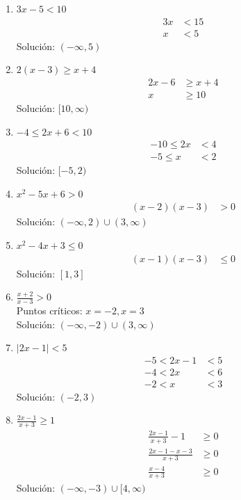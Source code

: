 \documentclass[12pt,a4paper]{article}
\begin{document}
\begin{enumerate}
    \item $3x - 5 < 10$
    \begin{align*}
        3x &< 15\\
        x &< 5
    \end{align*}
    Solución: $(-\infty, 5)$
    
    \item $2(x - 3) \geq x + 4$
    \begin{align*}
        2x - 6 &\geq x + 4\\
        x &\geq 10
    \end{align*}
    Solución: $[10, \infty)$
    
    \item $-4 \leq 2x + 6 < 10$
    \begin{align*}
        -10 \leq 2x &< 4\\
        -5 \leq x &< 2
    \end{align*}
    Solución: $[-5, 2)$
    
    \item $x^2 - 5x + 6 > 0$
    \begin{align*}
        (x - 2)(x - 3) &> 0
    \end{align*}
    Solución: $(-\infty, 2) \cup (3, \infty)$
    
    \item $x^2 - 4x + 3 \leq 0$
    \begin{align*}
        (x - 1)(x - 3) &\leq 0
    \end{align*}
    Solución: $[1, 3]$
    
    \item $\frac{x + 2}{x - 3} > 0$\\
    Puntos críticos: $x = -2, x = 3$\\
    Solución: $(-\infty, -2) \cup (3, \infty)$
    
    \item $|2x - 1| < 5$
    \begin{align*}
        -5 < 2x - 1 &< 5\\
        -4 < 2x &< 6\\
        -2 < x &< 3
    \end{align*}
    Solución: $(-2, 3)$
    
    \item $\frac{2x - 1}{x + 3} \geq 1$
    \begin{align*}
        \frac{2x - 1}{x + 3} - 1 &\geq 0\\
        \frac{2x - 1 - x - 3}{x + 3} &\geq 0\\
        \frac{x - 4}{x + 3} &\geq 0
    \end{align*}
    Solución: $(-\infty, -3) \cup [4, \infty)$
\end{enumerate}
\end{document}
